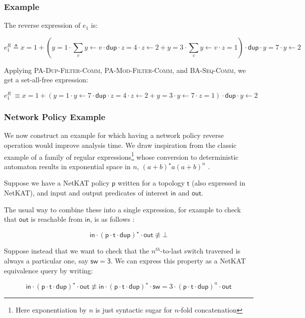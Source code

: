 \documentclass[acmsmall,dvipsnames,nonacm]{acmart}
\newcommand\dup{\mathsf{dup}}
\newcommand\ddd{\cdot\dup\cdot}
\newcommand\NetKAT{\textsf{NetKAT}\xspace}
\newcommand\zero{\bot}%
\begin{document}
\subsubsection{Example}

The reverse expression of $e_1$ is:

\[ e_1^R \triangleq x=1 + (y=1\cdot \sum_v y\gets v\ddd z=4 \cdot z \gets 2 +
        y=3\cdot \sum_v y\gets v \cdot z=1) \ddd y=7 \cdot y\gets 2
\]

Applying \textsc{PA-Dup-Filter-Comm},
         \textsc{PA-Mod-Filter-Comm}, and
         \textsc{BA-Seq-Comm}, we get a set-all-free expression:

\[ e_1^R\ \equiv x=1 + (y=1\cdot y\gets 7 \ddd z=4 \cdot z \gets 2 +
        y=3\cdot y\gets 7 \cdot z=1) \ddd y\gets 2
\]

\subsubsection{Network Policy Example}\label{sec:rev-fast-example}

We now construct an example for which having a network policy reverse operation
would improve analysis time. We draw inspiration from the classic example of
a family of regular expressions\footnote{Here exponentiation by $n$ is just syntactic sugar for
$n$-fold concatenation} whose conversion to deterministic automaton
results in exponential space in $n$, $(a+b)^\star a(a+b)^n$
\cite{hopcroft-automata}.

Suppose we have a \NetKAT policy $\mathsf{p}$ written for a topology
$\mathsf{t}$ (also expressed in \NetKAT), and input and output predicates of
interest $\mathsf{in}$ and $\mathsf{out}$.

The usual way to combine these into a single expression, for example to check that $\mathsf{out}$ is
reachable from $\mathsf{in}$, is as follows \cite{netkat}:

\[
\mathsf{in}\cdot(\mathsf{p}\cdot\mathsf{t}\cdot\dup)^\star\cdot\mathsf{out} \nequiv \zero
\]

Suppose instead that we want to check that the $n^{th}$-to-last switch traversed is always
a particular one, say $\mathsf{sw=3}$. We can express this property as a \NetKAT equivalence
query by writing:

\[
\mathsf{in}\cdot(\mathsf{p}\cdot\mathsf{t}\cdot\dup)^\star\cdot\mathsf{out} \nequiv
\mathsf{in}\cdot(\mathsf{p}\cdot\mathsf{t}\cdot\dup)^\star\cdot\mathsf{sw}=3\cdot
(\mathsf{p}\cdot\mathsf{t}\cdot\dup)^n\cdot\mathsf{out}
\]
\end{document}
